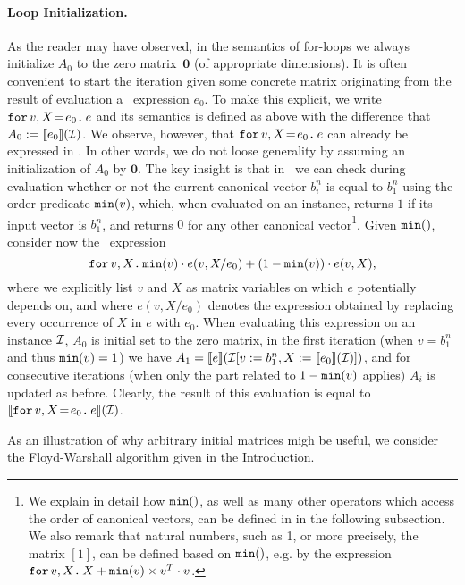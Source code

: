 \paragraph{Loop Initialization.} As the reader may have observed, in the semantics of for-loops we 
always initialize $A_0$ to the zero matrix~$\mathbf{0}$ (of appropriate dimensions). It is often convenient
to start the iteration given some concrete matrix  originating from the result of evaluation a \langfor\ expression $e_0$. To make this explicit, we write $\initf{e_0}{v}{X}{e}$ and its semantics is defined as above
with the difference that $A_0:=\sem{e_0}{\I}$. We observe, however, that $\initf{e_0}{v}{X}{e}$ can already
be expressed in \langfor. In other words, we do not loose generality by assuming an initialization of $A_0$ by $\mathbf{0}$.
The key insight is that in \langfor\ we can check during evaluation whether or not
the current canonical vector $b_i^n$ is equal to $b_1^n$ using the order predicate $\mmin{v}$, which, when evaluated on an instance, returns $1$ if its input vector is $b_1^n$, and returns $0$ for any other canonical vector\footnote{We explain in detail how $\mmin$, as well as many other operators which access the order of canonical vectors, can be defined in \langfor in the following subsection. We also remark that natural numbers, such as 1, or more precisely, the matrix $[1]$, can be defined based on $\mmin$, e.g. by the expression $\ffor{v}{X} X + \mmin{v}\times v^T\cdot v$.}. Given $\mmin$, consider now the
\langfor\ expression
 $$\ffor{v}{X}{\mmin{v}\cdot e(v,X/e_0) + (1-\mmin{v})\cdot e(v,X)},$$
 where we explicitly list $v$ and $X$ as matrix variables on which $e$ potentially depends on, and where
 $e(v,X/e_0)$ denotes the expression obtained by replacing every occurrence of $X$ in $e$ with $e_0$.
When evaluating this expression on an instance $\I$, $A_0$ is initial set to the zero matrix, in the first iteration (when  $v=b_1^n$ and thus $\mmin{v}=1$)
we have $A_1=\sem{e}{\I[v:=b_1^n,X:=\sem{e_0}{\I}]}$, and for consecutive iterations (when only the part related to $1-\mmin{v}$ applies) $A_i$ is updated as before. Clearly, the result of this evaluation is equal to
$\sem{\initf{e_0}{v}{X}{e}}{\I}$.


As an illustration of why arbitrary initial matrices migh be useful, we consider the Floyd-Warshall algorithm given in the Introduction. 

